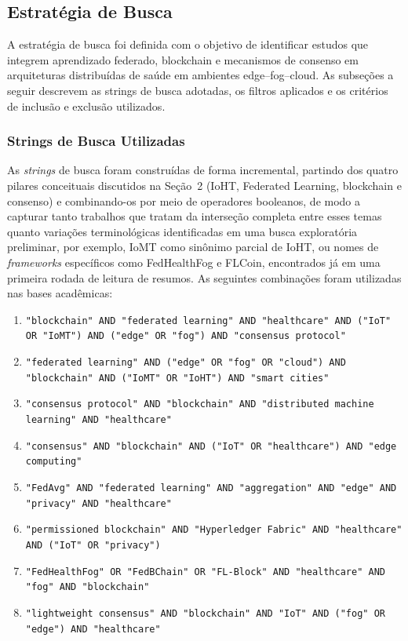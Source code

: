 \documentclass[12pt]{article}
\begin{document}
\subsection{Estratégia de Busca}

A estratégia de busca foi definida com o objetivo de identificar estudos que integrem aprendizado federado, blockchain e mecanismos de consenso em arquiteturas distribuídas de saúde em ambientes edge–fog–cloud. As subseções a seguir descrevem as strings de busca adotadas, os filtros aplicados e os critérios de inclusão e exclusão utilizados.

\subsubsection{Strings de Busca Utilizadas}

As \textit{strings} de busca foram construídas de forma incremental, partindo dos quatro pilares conceituais discutidos na Seção~2 (IoHT, Federated Learning, blockchain e consenso) e combinando-os por meio de operadores booleanos, de modo a capturar tanto trabalhos que tratam da interseção completa entre esses temas quanto variações terminológicas identificadas em uma busca exploratória preliminar, por exemplo, IoMT como sinônimo parcial de IoHT, ou nomes de \textit{frameworks} específicos como FedHealthFog e FLCoin, encontrados já em uma primeira rodada de leitura de resumos. As seguintes combinações foram utilizadas nas bases acadêmicas:

\begin{enumerate}
    \item \texttt{"blockchain" AND "federated learning" AND "healthcare" AND ("IoT" OR "IoMT") AND ("edge" OR "fog") AND "consensus protocol"}
    \item \texttt{"federated learning" AND ("edge" OR "fog" OR "cloud") AND "blockchain" AND ("IoMT" OR "IoHT") AND "smart cities"}
    \item \texttt{"consensus protocol" AND "blockchain" AND "distributed machine learning" AND "healthcare"}
    \item \texttt{"consensus" AND "blockchain" AND ("IoT" OR "healthcare") AND "edge computing"}
    \item \texttt{"FedAvg" AND "federated learning" AND "aggregation" AND "edge" AND "privacy" AND "healthcare"}
    \item \texttt{"permissioned blockchain" AND "Hyperledger Fabric" AND "healthcare" AND ("IoT" OR "privacy")}
    \item \texttt{"FedHealthFog" OR "FedBChain" OR "FL-Block" AND "healthcare" AND "fog" AND "blockchain"}
    \item \texttt{"lightweight consensus" AND "blockchain" AND "IoT" AND ("fog" OR "edge") AND "healthcare"}
\end{enumerate}
\end{document}
